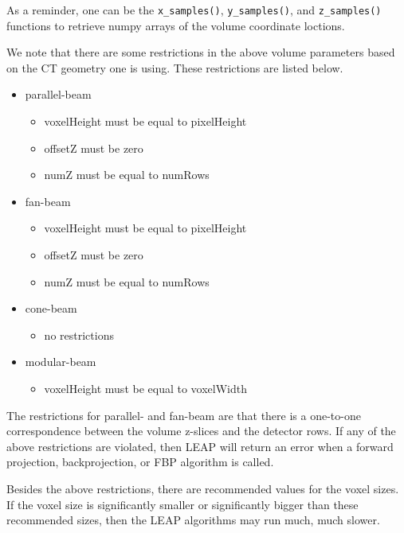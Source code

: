 \documentclass[11pt]{article}
\begin{document}
As a reminder, one can be the \texttt{x\_samples()}, \texttt{y\_samples()}, and \texttt{z\_samples()} functions to retrieve numpy arrays of the volume coordinate loctions.

We note that there are some restrictions in the above volume parameters based on the CT geometry one is using.  These restrictions are listed below.
\begin{itemize}
\item parallel-beam
    \begin{itemize}
    \item voxelHeight must be equal to pixelHeight
    \item offsetZ must be zero
    \item numZ must be equal to numRows
    \end{itemize}
\item fan-beam
    \begin{itemize}
    \item voxelHeight must be equal to pixelHeight
    \item offsetZ must be zero
    \item numZ must be equal to numRows
    \end{itemize}
\item cone-beam
    \begin{itemize}
    \item no restrictions
    \end{itemize}
\item modular-beam
    \begin{itemize}
    \item voxelHeight must be equal to voxelWidth
    \end{itemize}
\end{itemize}
The restrictions for parallel- and fan-beam are that there is a one-to-one correspondence between the volume z-slices and the detector rows.  If any of the above restrictions are violated, then LEAP will return an error when a forward projection, backprojection, or FBP algorithm is called.

Besides the above restrictions, there are recommended values for the voxel sizes.  If the voxel size is significantly smaller or significantly bigger than these recommended sizes, then the LEAP algorithms may run much, much slower.
\end{document}
